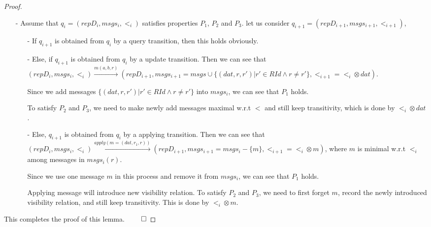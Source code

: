 \begin {proof}
\begin{itemize}
\item[-] Assume that $q_i=(repD_i,msgs_i,<_i)$ satisfies properties $P_1$, $P_2$ and $P_3$. let us consider $q_{i+1}= (repD_{i+1},msgs_{i+1},<_{i+1})$,

    \begin{itemize}
    \setlength{\itemsep}{0.5pt}
    \item[-] If $q_{i+1}$ is obtained from $q_i$ by a query transition, then this holds obviously.

    \item[-] Else, if $q_{i+1}$ is obtained from $q_i$ by a update transition. Then we can see that $(repD_i,msgs_i,<_i) {\xrightarrow{m(a,b,r)}} (repD_{i+1},msgs_{i+1}=msgs \cup \{ (dat,r,r') \vert  r' \in RId \wedge r \neq r' \},<_{i+1} = <_i \otimes dat)$.

        Since we add messages $\{ (dat,r,r') \vert  r' \in RId \wedge r \neq r' \}$ into $msgs_i$, we can see that $P_1$ holds.

        To satisfy $P_2$ and $P_3$, we need to make newly add messages maximal w.r.t $<$ and still keep transitivity, which is done by $<_i \otimes dat$.

    \item[-] Else, $q_{i+1}$ is obtained from $q_i$ by a applying transition. Then we can see that $(repD_i,msgs_i,<_i) {\xrightarrow{apply(m=(dat,r_1,r))}} (repD_{i+1},msgs_{i+1} = msgs_i - \{ m \}, <_{i+1} = <_i \otimes m )$, where $m$ is minimal w.r.t $<_i$ among messages in $msgs_i(r)$.

        Since we use one message $m$ in this process and remove it from $msgs_i$, we can see that $P_1$ holds.

        Applying message will introduce new visibility relation. To satisfy $P_2$ and $P_3$, we need to first forget $m$, record the newly introduced visibility relation, and still keep transitivity. This is done by $<_i \otimes m$.
    \end{itemize}
\end{itemize}

This completes the proof of this lemma. $\qed$
\end {proof}


















